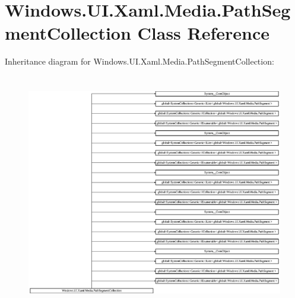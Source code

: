 \hypertarget{class_windows_1_1_u_i_1_1_xaml_1_1_media_1_1_path_segment_collection}{}\section{Windows.\+U\+I.\+Xaml.\+Media.\+Path\+Segment\+Collection Class Reference}
\label{class_windows_1_1_u_i_1_1_xaml_1_1_media_1_1_path_segment_collection}
Inheritance diagram for Windows.\+U\+I.\+Xaml.\+Media.\+Path\+Segment\+Collection\+:\begin{figure}[H]
\begin{center}
\leavevmode
\includegraphics[height=10.388693cm]{class_windows_1_1_u_i_1_1_xaml_1_1_media_1_1_path_segment_collection}
\end{center}
\end{figure}

